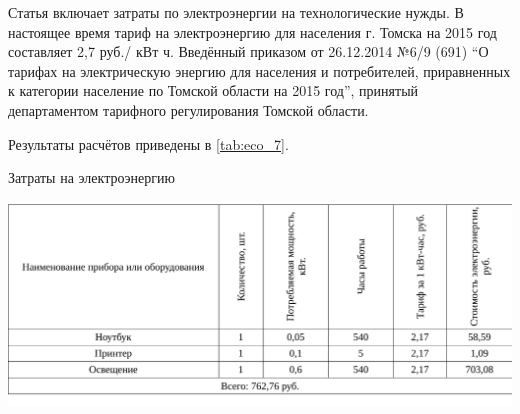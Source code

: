 Статья включает затраты по электроэнергии на технологические нужды. В настоящее время тариф на электроэнергию для населения г. Томска на 2015 год составляет 2,7 руб./ кВт ч. Введённый приказом от 26.12.2014 {\textquotedbl} №6/9 (691) ``О тарифах на электрическую энергию для населения и потребителей, приравненных к категории население по Томской области на 2015 год'', принятый департаментом тарифного регулирования Томской области.

Результаты расчётов приведены в \ref{tab:eco_7}.

\begin{table}[!ht]
\caption{Затраты на электроэнергию}
\centering
\includegraphics[page=1, width=1\linewidth]{econom_2.pdf}
\label{tab:eco_7}
\end{table}



\clearpage